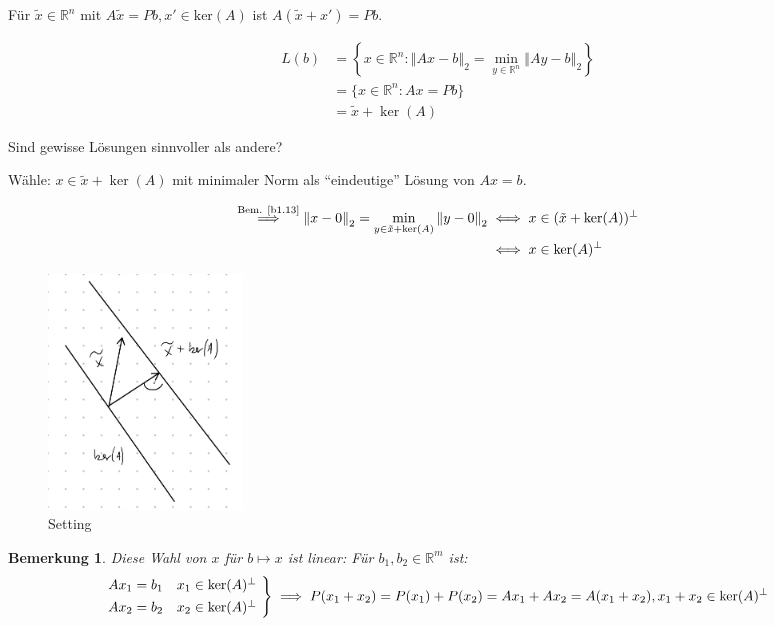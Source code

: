 \documentclass{book}
\newtheorem{remark}[algorithm]{Bemerkung}
\def\R{\mathbb{R}}
\begin{document}
            Für $\tilde{x}\in\R^n$ mit $A\tilde{x}=Pb,x'\in\text{ker}(A)$ ist $A(\tilde{x}+x')=Pb$.

            \begin{align*}
                L(b)&=\left\{x\in\R^n:\left\Vert Ax-b \right\Vert_2 = \min_{y\in\R^n} \left\Vert Ay-b \right\Vert_2\right\}\\
                &=\{x\in\R^n:Ax=Pb\}\\
                &=\tilde{x}+\ker(A)
            \end{align*}

            Sind gewisse Lösungen sinnvoller als andere?

            Wähle: $x\in\tilde{x}+\ker(A)$ mit minimaler Norm als ``eindeutige'' Lösung von $Ax=b$.

            \begin{align*}
                \stackrel{\text{Bem. \ref{b1.13}}}{\implies} \left\Vert x-0 \right\Vert_2 = \min_{y\in \tilde{x}+ \ker(A)} \left\Vert y-0 \right\Vert_2 &\iff x\in (\tilde{x}+\ker(A))^\perp \\
                &\iff x\in \ker(A)^\perp %
            \end{align*}
            
            \begin{figure}[H]
                \centering
                \includegraphics[width=0.25\textwidth]{Bild010}
                \caption{Setting}
            \end{figure}

            \begin{remark}\label{b2.21}
                Diese Wahl von $x$ für $b\mapsto x$ ist linear: Für $b_1,b_2\in\R^m$ ist:
                \[
                \begin{rcases*}
                Ax_1 = b_1 & $x_1 \in\text{ker}(A)^\perp$ \\
                Ax_2 = b_2 & $x_2 \in\text{ker}(A)^\perp$
                \end{rcases*} \implies P(x_1+x_2)=P(x_1)+P(x_2)=Ax_1+Ax_2=A(x_1+x_2),x_1+x_2\in \ker(A)^\perp
                \]
            \end{remark}
\end{document}
